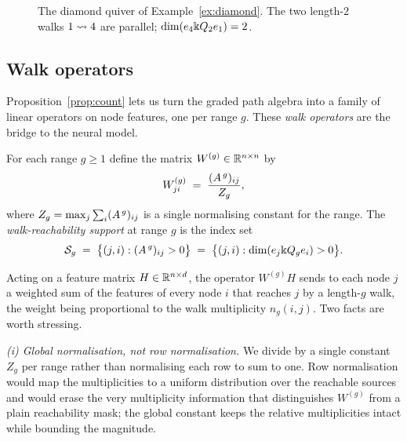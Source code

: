 \begin{figure}[t]
\centering
{}
\caption{The diamond quiver of Example~\ref{ex:diamond}. The two length-$2$ walks
$1\rightsquigarrow 4$ are parallel; $\dim(e_4\Bbbk Q_2 e_1)=2$.}
\label{fig:diamond}
\end{figure}

\subsection{Walk operators}

Proposition~\ref{prop:count} lets us turn the graded path algebra into a family of
linear operators on node features, one per range $g$. These \emph{walk operators}
are the bridge to the neural model.

\begin{definition}\label{def:walkop}
For each range $g\ge 1$ define the matrix $W^{(g)}\in\mathbb{R}^{n\times n}$ by
\[
  W^{(g)}_{j i}\;=\;\frac{(A^{\,g})_{ij}}{\,Z_g\,},
\]
where $Z_g=\max_{j}\sum_i (A^{\,g})_{ij}$ is a single normalising constant for
the range. The \emph{walk-reachability support} at range $g$ is the index set
\[
  \mathcal{S}_g \;=\; \bigl\{(j,i): (A^{\,g})_{ij}>0\bigr\}
  \;=\;\bigl\{(j,i): \dim(e_j\Bbbk Q_g e_i)>0\bigr\}.
\]
\end{definition}

Acting on a feature matrix $H\in\mathbb{R}^{n\times d}$, the operator $W^{(g)}H$ sends to
each node $j$ a weighted sum of the features of every node $i$ that reaches $j$ by
a length-$g$ walk, the weight being proportional to the walk multiplicity
$n_g(i,j)$. Two facts are worth stressing.

\emph{(i) Global normalisation, not row normalisation.} We divide by a single
constant $Z_g$ per range rather than normalising each row to sum to one. Row
normalisation would map the multiplicities to a uniform distribution over the
reachable sources and would erase the very multiplicity information that
distinguishes $W^{(g)}$ from a plain reachability mask; the global constant keeps
the relative multiplicities intact while bounding the magnitude.

